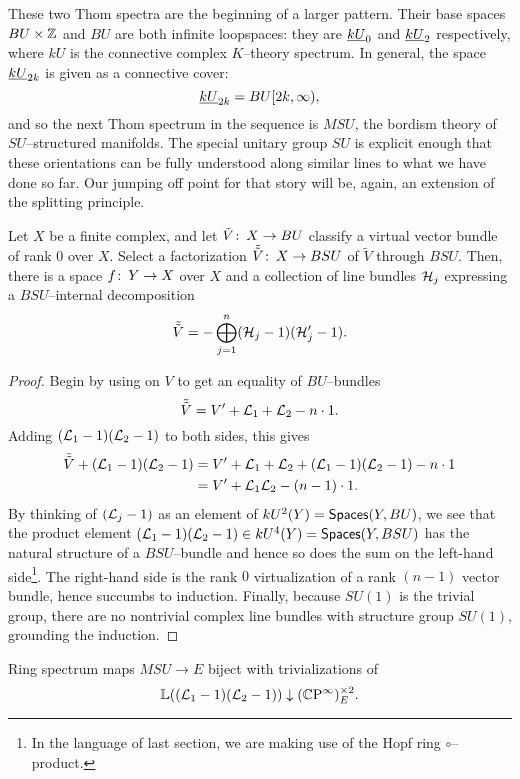 These two Thom spectra are the beginning of a larger pattern.  Their base spaces $BU \times \mathbb Z$ and $BU$ are both infinite loopspaces: they are $\underline{\smash{kU}}_{0}$ and $\underline{\smash{kU}}_{2}$ respectively, where $kU$ is the connective complex $K$--theory spectrum.  In general, the space $\underline{\smash{kU}}_{2k}$ is given as a connective cover: \[\underline{\smash{kU}}_{2k} = BU[2k, \infty),\] and so the next Thom spectrum in the sequence is $MSU$, the bordism theory of $SU$--structured manifolds.  The special unitary group $SU$ is explicit enough that these orientations can be fully understood along similar lines to what we have done so far.  Our jumping off point for that story will be, again, an extension of the splitting principle.
\begin{lemma}\label{SplittingPrincipleForBSU}
Let $X$ be a finite complex, and let $\tilde V\colon\thinspace X \to BU$ classify a virtual vector bundle of rank $0$ over $X$.  Select a factorization $\tilde{\tilde V}\colon\thinspace X \to BSU$ of $\tilde V$ through $BSU$.  Then, there is a space $f\colon\thinspace Y \to X$ over $X$ and a collection of line bundles $\mathcal{H}_j$ expressing a $BSU$--internal decomposition \[\tilde{\tilde V} = -\bigoplus_{j=1}^n (\mathcal{H}_j - 1)(\mathcal{H}'_j - 1).\]
\end{lemma}
\begin{proof}
Begin by using  on $V$ to get an equality of $BU$--bundles \[\tilde{\tilde V} = V' + \mathcal{L}_1 + \mathcal{L}_2 - n \cdot 1.\]  Adding $(\mathcal{L}_1 - 1)(\mathcal{L}_2 - 1)$ to both sides, this gives
\begin{align*}
\tilde{\tilde V} + (\mathcal{L}_1 - 1)(\mathcal{L}_2 - 1) & = V' + \mathcal{L}_1 + \mathcal{L}_2 + (\mathcal{L}_1 - 1)(\mathcal{L}_2 - 1) - n \cdot 1 \\
& = V' + \mathcal{L}_1\mathcal{L}_2 - (n-1) \cdot 1.
\end{align*}
By thinking of $(\mathcal{L}_j - 1)$ as an element of $kU^2(Y) = \mathsf{Spaces}(Y, BU)$, we see that the product element $(\mathcal{L}_1 - 1)(\mathcal{L}_2 - 1) \in kU^4(Y) = \mathsf{Spaces}(Y, BSU)$ has the natural structure of a $BSU$--bundle and hence so does the sum on the left-hand side\footnote{In the language of last section, we are making use of the Hopf ring $\circ$--product.}.  The right-hand side is the rank $0$ virtualization of a rank $(n-1)$ vector bundle, hence succumbs to induction.  Finally, because $SU(1)$ is the trivial group, there are no nontrivial complex line bundles with structure group $SU(1)$, grounding the induction.
\end{proof}

\begin{corollary}
Ring spectrum maps $MSU \to E$ biject with trivializations of \[\ThomSheaf{(\L_1 - 1)(\L_2 - 1)} \downarrow (\CP^\infty)^{\times 2}_E. \qed \]
\end{corollary}

